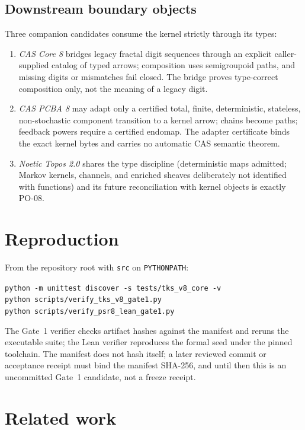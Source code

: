 \documentclass[11pt]{amsart}
\theoremstyle{definition}
\theoremstyle{remark}
\begin{document}
\subsection{Downstream boundary objects}
Three companion candidates consume the kernel strictly through its types:
\begin{enumerate}
\item \emph{CAS Core 8} bridges legacy fractal digit sequences through an explicit caller-supplied catalog of typed arrows; composition uses semigroupoid paths, and missing digits or mismatches fail closed. The bridge proves type-correct composition only, not the meaning of a legacy digit.
\item \emph{CAS PCBA 8} may adapt only a certified total, finite, deterministic, stateless, non-stochastic component transition to a kernel arrow; chains become paths; feedback powers require a certified endomap. The adapter certificate binds the exact kernel bytes and carries no automatic CAS semantic theorem.
\item \emph{Noetic Topos 2.0} shares the type discipline (deterministic maps admitted; Markov kernels, channels, and enriched sheaves deliberately not identified with functions) and its future reconciliation with kernel objects is exactly PO-08.
\end{enumerate}

\section{Reproduction}\label{sec:repro}

From the repository root with \texttt{src} on \texttt{PYTHONPATH}:
\begin{center}
\texttt{python -m unittest discover -s tests/tks\_v8\_core -v}\\[2pt]
\texttt{python scripts/verify\_tks\_v8\_gate1.py}\\[2pt]
\texttt{python scripts/verify\_psr8\_lean\_gate1.py}
\end{center}
The Gate~1 verifier checks artifact hashes against the manifest and reruns the executable suite; the Lean verifier reproduces the formal seed under the pinned toolchain. The manifest does not hash itself; a later reviewed commit or acceptance receipt must bind the manifest SHA-256, and until then this is an uncommitted Gate~1 candidate, not a freeze receipt.

\section{Related work}\label{sec:related}
\end{document}
